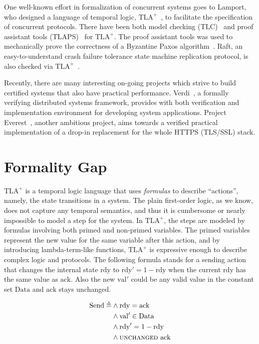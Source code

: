 \documentclass[twocolumn]{article}
\begin{document}
One well-known effort in formalization of concurrent systems goes to Lamport,
who designed a language of temporal logic,
$\textrm{TLA}^+$~\cite{lamport2000specifying}, to facilitate the specification
of concurrent protocols. There have been both model checking
(TLC)~\cite{yu1999model} and proof assistant tools
(TLAPS)~\cite{cousineau2012tla+} for $\textrm{TLA}^+$. The proof assistant
tools was used to mechanically prove the correctness of a Byzantine Paxos
algorithm~\cite{lamport2015mechanically}. Raft, an easy-to-understand crash
failure tolerance state machine replication protocol, is also checked via
$\textrm{TLA}^+$~\cite{ongaro2014consensus}.

Recently, there are many interesting on-going projects which strive to build
certified systems that also have practical performance.
Verdi~\cite{wilcox2015verdi}, a formally verifying distributed systems
framework, provides with both verification and implementation environment for
developing system applications. Project Everest~\cite{bhargavan2017everest}, another
ambitious project, aims towards a verified practical implementation of a
drop-in replacement for the whole HTTPS (TLS/SSL) stack.

\section{Formality Gap}
$\textrm{TLA}^+$ is a temporal logic language that uses \emph{formulas} to
describe ``actions'', namely, the state transitions in a system. The plain
first-order logic, as we know, does not capture any temporal semantics, and
thus it is cumbersome or nearly impossible to model a step for the system. In
$\textrm{TLA}^+$, the steps are modeled by formulas involving both primed and
non-primed variables. The primed variables represent the new value for the
same variable after this action, and by introducing lambda-term-like functions,
$\textrm{TLA}^+$ is expressive enough to describe complex logic and protocols.
The following formula stands for a sending action that changes the internal
state $\mathrm{rdy}$ to $\mathrm{rdy}' = 1 - \mathrm{rdy}$ when the current
$\mathrm{rdy}$ has the same value as $\mathrm{ack}$. Also the new
$\mathrm{val}'$ could be any valid value in the constant set $\mathrm{Data}$
and $\mathrm{ack}$ stays unchanged.

\begin{align*}
    \mathrm{Send} \triangleq &\land \mathrm{rdy} = \mathrm{ack} \\
                             &\land \mathrm{val}' \in \mathrm{Data} \\
                             &\land \mathrm{rdy}' = 1 - \mathrm{rdy} \\
                             &\land \textsc{unchanged}\,\,\mathrm{ack}
\end{align*}
\end{document}
